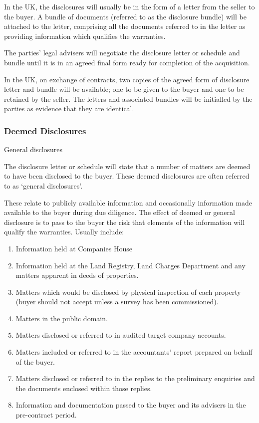 \documentclass[
]{article}
\providecommand{\tightlist}{%
  \setlength{\itemsep}{0pt}\setlength{\parskip}{0pt}}
\newenvironment{env-3a4a363c-8d41-4783-bfde-af85d2b9ad5f}
{
    \savenotes\tcolorbox[blanker,breakable,left=5pt,borderline west={2pt}{-4pt}{gold}]
}
{
    \endtcolorbox\spewnotes
}
\begin{document}
In the UK, the disclosures will usually be in the form of a letter from
the seller to the buyer. A bundle of documents (referred to as the
disclosure bundle) will be attached to the letter, comprising all the
documents referred to in the letter as providing information which
qualifies the warranties.

The parties' legal advisers will negotiate the disclosure letter or
schedule and bundle until it is in an agreed final form ready for
completion of the acquisition.

In the UK, on exchange of contracts, two copies of the agreed form of
disclosure letter and bundle will be available; one to be given to the
buyer and one to be retained by the seller. The letters and associated
bundles will be initialled by the parties as evidence that they are
identical.

\hypertarget{deemed-disclosures}{%
\subsubsection{Deemed Disclosures}\label{deemed-disclosures}}

\begin{env-3a4a363c-8d41-4783-bfde-af85d2b9ad5f}

General disclosures

The disclosure letter or schedule will state that a number of matters
are deemed to have been disclosed to the buyer. These deemed disclosures
are often referred to as `general disclosures'.

\end{env-3a4a363c-8d41-4783-bfde-af85d2b9ad5f}

These relate to publicly available information and occasionally
information made available to the buyer during due diligence. The effect
of deemed or general disclosure is to pass to the buyer the risk that
elements of the information will qualify the warranties. Usually
include:

\begin{enumerate}
\tightlist
\item
  Information held at Companies House
\item
  Information held at the Land Registry, Land Charges Department and any
  matters apparent in deeds of properties.
\item
  Matters which would be disclosed by physical inspection of each
  property (buyer should not accept unless a survey has been
  commissioned).
\item
  Matters in the public domain.
\item
  Matters disclosed or referred to in audited target company accounts.
\item
  Matters included or referred to in the accountants' report prepared on
  behalf of the buyer.
\item
  Matters disclosed or referred to in the replies to the preliminary
  enquiries and the documents enclosed within those replies.
\item
  Information and documentation passed to the buyer and its advisers in
  the pre-contract period.
\end{enumerate}
\end{document}
